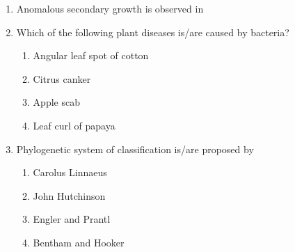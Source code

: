 \documentclass[journal,12pt,onecolumn]{IEEEtran}
\theoremstyle{remark}
\begin{document}
\begin{enumerate}
    \hfill{}
    \begin{enumerate}
    \end{enumerate}

    \item Anomalous secondary growth is observed in

    \hfill{}
    \begin{enumerate}
    \end{enumerate}

    \item Which of the following plant diseases is/are caused by bacteria?

    \hfill{}
    \begin{enumerate}
        \item Angular leaf spot of cotton
        \item Citrus canker
        \item Apple scab
        \item Leaf curl of papaya
    \end{enumerate}

    \item Phylogenetic system of classification is/are proposed by

    \hfill{}
    \begin{enumerate}
        \item Carolus Linnaeus
        \item John Hutchinson
        \item Engler and Prantl
        \item Bentham and Hooker
    \end{enumerate}


\end{enumerate}
\end{document}
